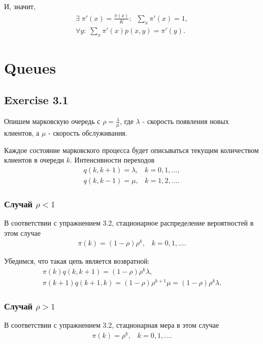 \documentclass[10pt]{article}
\begin{document}
И, значит,
\begin{gather*}
  \exists \; \pi'(x) = \frac{\pi(x)}{K}: \;\; \sum\limits_{x} \pi'(x) = 1, \\
  \forall y: \; \sum\limits_{x} \pi'(x) p(x, y) = \pi'(y).
\end{gather*}

\section{Queues}

\subsection{Exercise 3.1}

Опишем марковскую очередь с $\rho = \frac{\lambda}{\mu}$, где $\lambda$ - скорость появления новых клиентов, а $\mu$ - скорость обслуживания.

Каждое состояние марковского процесса будет описываться текущим количеством клиентов в очереди $k$.
Интенсивности переходов
\begin{gather*}
  q(k, k + 1) = \lambda, \;\;\; k = 0, 1, \ldots , \\
  q(k, k - 1) = \mu, \;\;\; k = 1, 2, \ldots .
\end{gather*}

\subsubsection{Случай $\rho < 1$}

В соответствии с упражнением 3.2, стационарное распределение вероятностей в этом случае
\begin{gather*}
  \pi(k) = (1 - \rho) \rho^k, \;\;\; k = 0, 1, \ldots .
\end{gather*}

Убедимся, что такая цепь является возвратной:
\begin{gather*}
  \pi(k) q(k, k + 1) = (1 - \rho) \rho^k \lambda, \\
  \pi(k + 1) q(k + 1, k) = (1 - \rho) \rho^{k + 1} \mu = (1 - \rho) \rho^k \lambda.
\end{gather*}

\subsubsection{Случай $\rho > 1$}

В соответствии с упражнением 3.2, стационарная мера в этом случае
\begin{gather*}
  \pi(k) = \rho^k, \;\;\; k = 0, 1, \ldots .
\end{gather*}
\end{document}
